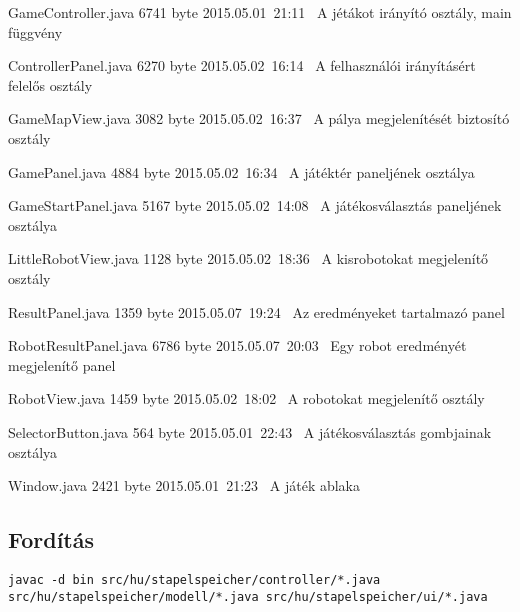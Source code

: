 \begin{fajllista}
\fajl
{GameController.java} %
{6741 byte} %
{2015.05.01~21:11~} %
{A jétákot irányító osztály, main függvény} %

\fajl
{ControllerPanel.java} %
{6270 byte} %
{2015.05.02~16:14~} %
{A felhasználói irányításért felelős osztály} %

\fajl
{GameMapView.java} %
{3082 byte} %
{2015.05.02~16:37~} %
{A pálya megjelenítését biztosító osztály} %

\fajl
{GamePanel.java} %
{4884 byte} %
{2015.05.02~16:34~} %
{A játéktér paneljének osztálya} %

\fajl
{GameStartPanel.java} %
{5167 byte} %
{2015.05.02~14:08~} %
{A játékosválasztás paneljének osztálya} %

\fajl
{LittleRobotView.java} %
{1128 byte} %
{2015.05.02~18:36~} %
{A kisrobotokat megjelenítő osztály} %

\fajl
{ResultPanel.java} %
{1359 byte} %
{2015.05.07~19:24~} %
{Az eredményeket tartalmazó panel} %

\fajl
{RobotResultPanel.java} %
{6786 byte} %
{2015.05.07~20:03~} %
{Egy robot eredményét megjelenítő panel} %

\fajl
{RobotView.java} %
{1459 byte} %
{2015.05.02~18:02~} %
{A robotokat megjelenítő osztály} %

\fajl
{SelectorButton.java} %
{564 byte} %
{2015.05.01~22:43~} %
{A játékosválasztás gombjainak osztálya} %

\fajl
{Window.java} %
{2421 byte} %
{2015.05.01~21:23~} %
{A játék ablaka} %

\end{fajllista}

\subsection{Fordítás}

\lstset{escapeinside=`', xleftmargin=10pt, frame=single, basicstyle=\ttfamily\footnotesize, language=sh}
\begin{lstlisting}
javac -d bin src/hu/stapelspeicher/controller/*.java
src/hu/stapelspeicher/modell/*.java src/hu/stapelspeicher/ui/*.java
\end{lstlisting}

